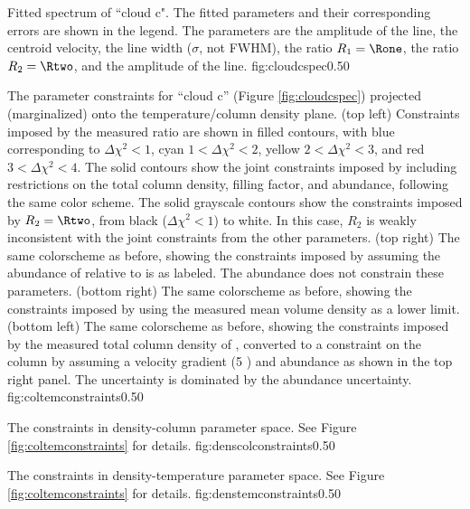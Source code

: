 {Fitted spectrum of ``cloud c".  The fitted parameters and their corresponding
errors are shown in the legend.  The parameters are the amplitude of the
\formaldehyde \threeohthree line, the centroid velocity, the line width
($\sigma$, not FWHM), the ratio $R_1 = \Rone$,
the ratio $R_2 = \Rtwo$, and the amplitude of
the \methanol \fourtwotwo line.  }
{fig:cloudcspec}{0.5}{0}

{The parameter constraints for ``cloud c'' (Figure \ref{fig:cloudcspec})
projected (marginalized) onto the temperature/column density plane.\newline
(top left) Constraints imposed by the measured ratio \Rone are shown in filled contours,
with blue corresponding to $\Delta\chi^2 < 1$, cyan $1 < \Delta\chi^2 < 2$,
yellow $2 < \Delta\chi^2 < 3$, and red $3 < \Delta\chi^2 < 4$.  The solid
contours show the joint constraints imposed by including restrictions on the
total column density, filling factor, and abundance, following the same color
scheme.  The solid grayscale contours show the constraints imposed by
$R_2=\Rtwo$, from black ($\Delta\chi^2 < 1$) to white.  In this case, $R_2$
is weakly inconsistent with the joint constraints from the other parameters.
\newline
(top right) The same colorscheme as before, showing the constraints imposed by
assuming the abundance of \para relative to \hh is as labeled.  
The abundance does not constrain these parameters.
\newline
(bottom right) The same colorscheme as before, showing the constraints imposed
by using the measured mean volume density as a lower limit.
\newline
(bottom left) The same colorscheme as before, showing the constraints imposed
by the measured total column density of \hh, converted to a constraint on the
\para column by assuming a velocity gradient (5 \kms \perpc) and abundance as
shown in the top right panel.  The uncertainty is dominated by the abundance
uncertainty.
}
{fig:coltemconstraints}{0.5}{0}

{The constraints in density-column parameter space.
See Figure \ref{fig:coltemconstraints} for details.
}
{fig:denscolconstraints}{0.5}{0}

{The constraints in density-temperature parameter space.
See Figure \ref{fig:coltemconstraints} for details.}
{fig:denstemconstraints}{0.5}{0}

